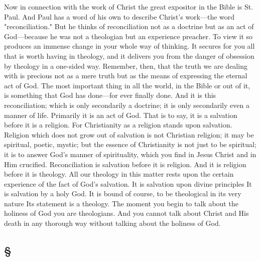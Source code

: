 \documentclass[draft]{ptfdoc}
\begin{document}
Now in connection with the work of Christ 
the great expositor in the Bible is St. Paul. 
And Paul has a word of his own to describe 
Christ's work---the word "reconciliation." But 
he thinks of reconciliation not as a doctrine but 
as an act of God---because he was not a theologian 
but an experience preacher. To view it 
so produces an immense change in your whole 
way of thinking. It secures for you all that 
is worth having in theology, and it delivers 
you from the danger of obsession by theology 
in a one-sided way. Remember, then, that the 
truth we are dealing with is precious not as a 
mere truth but as the means of expressing the 
eternal act of God. The most important thing 
in all the world, in the Bible or out of it, is 
something that God has done---for ever finally 
done. And it is this reconciliation; which is 
only secondarily a doctrine; it is only secondarily 
even a manner of life. Primarily it is an act of 
God. That is to say, it is a salvation before it is 
a religion. For Christianity as a religion stands 
upon salvation. Religion which does not grow 
out of salvation is not Christian religion; it 
may be spiritual, poetic, mystic; but the essence 
of Christianity is not just to be spiritual; it is 
to answer God's manner of spirituality, which 
you find in Jesus Christ and in Him crucified. 
Reconciliation is salvation before it is religion. 
And it is religion before it is theology. All 
our theology in this matter rests upon the 
certain experience of the fact of God's salvation. 
It is salvation upon divine principles 
It is salvation by a holy God. It is bound 
of course, to be theological in its very nature 
Its statement is a theology. The moment 
you begin to talk about the holiness of God 
you are theologians. And you cannot talk 
about Christ and His death in any thorough 
way without talking about the holiness of 
God. 

\subsection*{
\S 
} 
\end{document}
